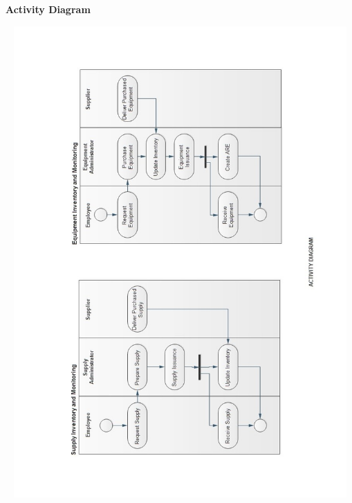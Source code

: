 \begin{center} 
	\textbf{Activity Diagram}
\end{center}
\begin{center}
	\includegraphics[width=14cm,height=18cm]{image/g1.jpg}

\end{center}
